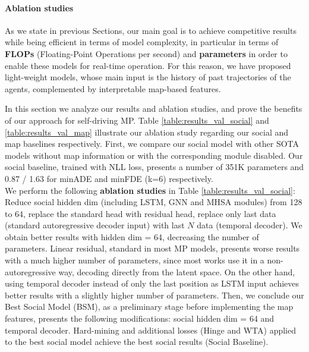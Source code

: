 \paragraph{Ablation studies}

As we state in previous Sections, our main goal is to achieve competitive results while being efficient in terms of model complexity, in particular in terms of \textbf{FLOPs} (Floating-Point Operations per second) and \textbf{parameters} in order to enable these models for real-time operation. For this reason, we have proposed light-weight models, whose main input is the history of past trajectories of the agents, complemented by interpretable map-based features. 

In this section we analyze our results and ablation studies, and prove the benefits of our approach for self-driving MP. Table \ref{table:results_val_social} and \ref{table:results_val_map} illustrate our ablation study regarding our social and map baselines respectively. First, we compare our social model with other SOTA models \cite{liang2020learning} \cite{khandelwal2020if} \cite{schmidt2022crat} without map information or with the corresponding module disabled. Our social baseline, trained with NLL loss, presents a number of 351K parameters and 0.87 / 1.63 for minADE and minFDE (k=6) respectively. \\

We perform the following \textbf{ablation studies} in Table \ref{table:results_val_social}: Reduce social hidden dim (including LSTM, GNN and MHSA modules) from 128 to 64, replace the standard head with residual head, replace only last data (standard autoregressive decoder input) with last $N$ data (temporal decoder). We obtain better results with hidden dim = 64, decreasing the number of parameters. Linear residual, standard in most MP models, presents worse results with a much higher number of parameters, since most works use it in a non-autoregressive way, decoding directly from the latent space. On the other hand, using temporal decoder instead of only the last position as LSTM input achieves better results with a slightly higher number of parameters. Then, we conclude our Best Social Model (BSM), as a preliminary stage before implementing the map features, presents the following modifications: social hidden dim = 64 and temporal decoder. Hard-mining and additional losses (Hinge and WTA) applied to the best social model achieve the best social results (Social Baseline).

